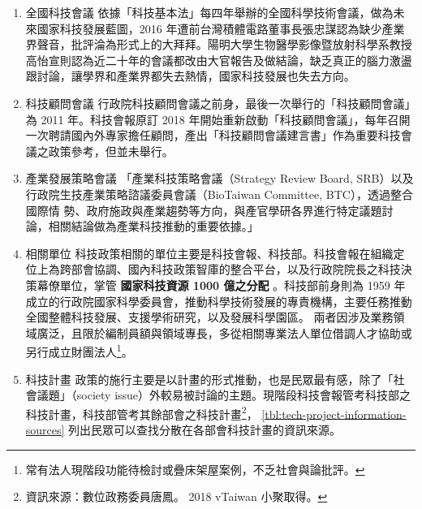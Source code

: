 \documentclass[12pt,a4paper]{article}
\begin{document}
\begin{enumerate}
\item 全國科技會議
\label{sec:org3924b0a}
依據「科技基本法」每四年舉辦的全國科學技術會議，做為未來國家科技發展藍圖，2016 年遭前台灣積體電路董事長張忠謀認為缺少產業界聲音，批評淪為形式上的大拜拜。陽明大學生物醫學影像暨放射科學系教授高怡宣則認為近二十年的會議都改由大官報告及做結論，缺乏真正的腦力激盪跟討論，讓學界和產業界都失去熱情，國家科技發展也失去方向。
\item 科技顧問會議
\label{sec:orgd72c28e}
行政院科技顧問會議之前身，最後一次舉行的「科技顧問會議」為 2011 年。科技會報原訂 2018 年開始重新啟動「科技顧問會議」，每年召開 一次聘請國內外專家擔任顧問，產出「科技顧問會議建言書」作為重要科技會議之政策參考，但並未舉行。
\item 產業發展策略會議
\label{sec:org7398fab}
「產業科技策略會議（Strategy Review Board, SRB）以及行政院生技產業策略諮議委員會議（BioTaiwan Committee, BTC），透過整合國際情
勢、政府施政與產業趨勢等方向，與產官學研各界進行特定議題討論，相關結論做為產業科技推動的重要依據。」\citep*{guo17}
\item 相關單位
\label{sec:org59c10b7}
科技政策相關的單位主要是科技會報、科技部。科技會報在組織定位上為跨部會協調、國內科技政策智庫的整合平台，以及行政院院長之科技決策幕僚單位，掌管 \textbf{國家科技資源 1000 億之分配} 。科技部前身則為 1959 年成立的行政院國家科學委員會，推動科學技術發展的專責機構，主要任務推動全國整體科技發展、支援學術研究，以及發展科學園區。
兩者因涉及業務領域廣泛，且限於編制員額與領域專長，多從相關專業法人單位借調人才協助或另行成立財團法人\footnote{常有法人現階段功能待檢討或疊床架屋案例，不乏社會與論批評。}。
\item 科技計畫
\label{sec:org4e29bf2}
政策的施行主要是以計畫的形式推動，也是民眾最有感，除了「社會議題」（society issue）外較易被討論的主題。現階段科技會報管考科技部之科技計畫，科技部管考其餘部會之科技計畫\footnote{資訊來源：數位政務委員唐鳳。 2018 vTaiwan 小聚取得。}， \ref{tbl:tech-project-information-sources} 列出民眾可以查找分散在各部會科技計畫的資訊來源。


\end{enumerate}
\end{document}
